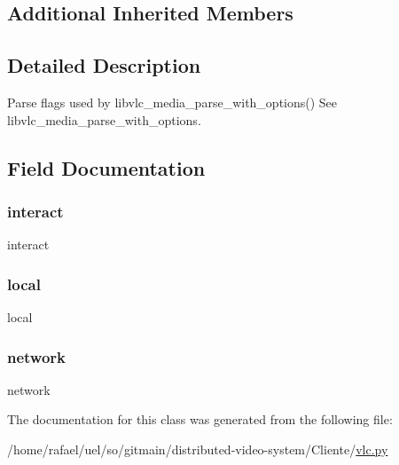 \subsection*{Additional Inherited Members}


\subsection{Detailed Description}
\begin{DoxyVerb}Parse flags used by libvlc_media_parse_with_options()
See libvlc_media_parse_with_options.
\end{DoxyVerb}
 

\subsection{Field Documentation}
\mbox{\label{classvlc_1_1_media_parse_flag_a3f082c25d75474761ff2a232ff933552}} 
\subsubsection{\texorpdfstring{interact}{interact}}
{\footnotesize\ttfamily interact\hspace{0.3cm}{\ttfamily [static]}}

\mbox{\label{classvlc_1_1_media_parse_flag_a96db3da3652c2ce91fd6b07f397ab3f5}} 
\subsubsection{\texorpdfstring{local}{local}}
{\footnotesize\ttfamily local\hspace{0.3cm}{\ttfamily [static]}}

\mbox{\label{classvlc_1_1_media_parse_flag_a6b288a470bcb2fd5f321915ef4045b8b}} 
\subsubsection{\texorpdfstring{network}{network}}
{\footnotesize\ttfamily network\hspace{0.3cm}{\ttfamily [static]}}



The documentation for this class was generated from the following file\+:\begin{DoxyCompactItemize}
\item 
/home/rafael/uel/so/gitmain/distributed-\/video-\/system/\+Cliente/\hyperlink{vlc_8py}{vlc.\+py}\end{DoxyCompactItemize}
